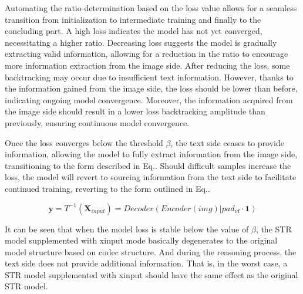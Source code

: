 \documentclass[runningheads]{llncs}
\begin{document}
Automating the ratio determination based on the loss value allows for a seamless transition from initialization to intermediate training and finally to the concluding part.	A high loss indicates the model has not yet converged, necessitating a higher ratio.	Decreasing loss suggests the model is gradually extracting valid information, allowing for a reduction in the ratio to encourage more information extraction from the image side.	After reducing the loss, some backtracking may occur due to insufficient text information. However, thanks to the information gained from the image side, the loss should be lower than before, indicating ongoing model convergence.	Moreover, the information acquired from the image side should result in a lower loss backtracking amplitude than previously, ensuring continuous model convergence.	

Once the loss converges below the threshold $\beta $, the text side ceases to provide information, allowing the model to fully extract information from the image side, transitioning to the form described in Eq.\cite{eq:end}.	Should difficult samples increase the loss, the model will revert to sourcing information from the text side to facilitate continued training, reverting to the form outlined in Eq.\cite{eq:inter}.	

\begin{equation}\label{eq:end}
    \textbf{y} = \textit{T}^{-1}(\textbf{X}_{input}) = \textit{Decoder}(\textit{Encoder}(img) | pad_{id} \cdot \textbf{1})
\end{equation}

It can be seen that when the model loss is stable below the value of $\beta$, the STR model supplemented with xinput mode basically degenerates to the original model structure based on codec structure. And during the reasoning process, the text side does not provide additional information. That is, in the worst case, a STR model supplemented with xinput should have the same effect as the original STR model.
\end{document}
